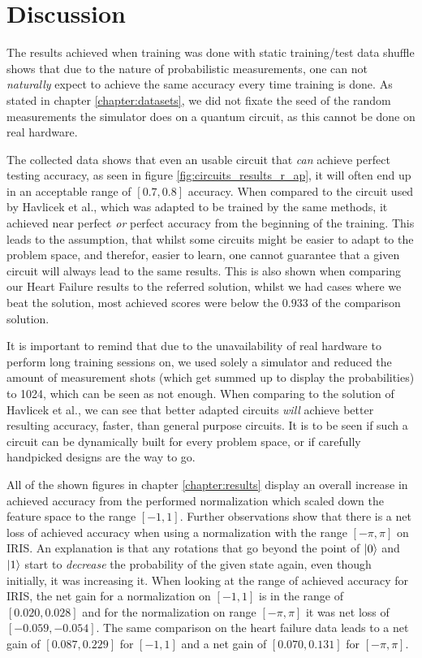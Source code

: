 \clearpage

\section{Discussion}
The results achieved when training was done with static training/test data shuffle shows that due to the nature of probabilistic measurements, one can not \emph{naturally} expect to achieve the same accuracy every time training is done. As stated in chapter \ref{chapter:datasets}, we did not fixate the seed of the random measurements the simulator does on a quantum circuit, as this cannot be done on real hardware.\par 
The collected data shows that even an usable circuit that \emph{can} achieve perfect testing accuracy, as seen in figure \ref{fig:circuits_results_r_ap}, it will often end up in an acceptable range of $[0.7, 0.8]$ accuracy. When compared to the circuit used by Havlicek et al.\cite{havlicek_supervised_2019}, which was adapted to be trained by the same methods, it achieved near perfect \emph{or} perfect accuracy from the beginning of the training. This leads to the assumption, that whilst some circuits might be easier to adapt to the problem space, and therefor, easier to learn, one cannot guarantee that a given circuit will always lead to the same results. This is also shown when comparing our Heart Failure results to the referred solution, whilst we had cases where we beat the solution, most achieved scores were below the $0.933$ of the comparison solution.\par 
It is important to remind that due to the unavailability of real hardware to perform long training sessions on, we used solely a simulator and reduced the amount of measurement shots (which get summed up to display the probabilities) to 1024, which can be seen as not enough. When comparing to the solution of Havlicek et al., we can see that better adapted circuits \emph{will} achieve better resulting accuracy, faster, than general purpose circuits. It is to be seen if such a circuit can be dynamically built for every problem space, or if carefully handpicked designs are the way to go.\par
All of the shown figures in chapter \ref{chapter:results} display an overall increase in achieved accuracy from the performed normalization which scaled down the feature space to the range $[-1,1]$. Further observations show that there is a net loss of achieved accuracy when using a normalization with the range $[-\pi,\pi]$ on IRIS. An explanation is that any rotations that go beyond the point of $\ket{0}$ and $\ket{1}$ start to \emph{decrease} the probability of the given state again, even though initially, it was increasing it. When looking at the range of achieved accuracy for IRIS, the net gain for a normalization on $[-1,1]$ is in the range of $[0.020,0.028]$ and for the normalization on range $[-\pi,\pi]$ it was net loss of $[-0.059,-0.054]$. The same comparison on the heart failure data leads to a net gain of $[0.087, 0.229]$ for $[-1,1]$ and a net gain of $[0.070,0.131]$ for $[-\pi,\pi]$. \par
